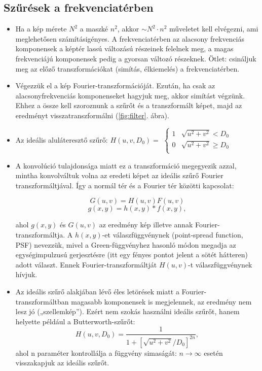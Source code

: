 \documentclass[12pt]{article}
\theoremstyle{plain}
\begin{document}
\subsection{Szűrések a frekvenciatérben}
\begin{itemize}
\item Ha a kép mérete $N^2$ a maszké $n^2$, akkor $\sim N^2 \cdot n^2$ műveletet kell elvégezni, ami meglehetősen számításigényes. A frekvenciatérben az alacsony frekvenciás komponensek a képtér lassú változású részeinek felelnek meg, a magas frekvenciájú komponensek pedig a gyorsan változó részeknek. Ötlet: csináljuk meg az előző transzformációkat (simítás, élkiemelés) a frekvenciatérben.
\item Végezzük el a kép Fourier-transzformációját. Ezután, ha csak az alacsonyfrekvenciás komponenseket hagyjuk meg, akkor simítást végzünk. Ehhez a össze kell szoroznunk a szűrőt és a transzformált képet, majd az eredményt visszatranszformálni (\ref{fig:filter}. ábra).
\item Az ideális aluláteresztő szűrő: $H(u,v,D_0) =$    $\left\{
\begin{array}{ll}
      1 & \sqrt{u^2 + v^2} < D_0 \\
      0 & \sqrt{u^2 + v^2} \geq D_0 \\
\end{array} \right.$
\item A konvolúció tulajdonsága miatt ez a transzformáció megegyezik azzal, mintha konvolváltuk volna az eredeti  képet az ideális szűrő Fourier transzformáltjával. Így a normál tér és a Fourier tér közötti kapcsolat:

$$G(u,v) = H(u,v)F(u,v)$$
$$g(x,y) = h(x,y) * f(x,y),$$

ahol $g(x,y)$ és $G(u,v)$ az eredmény kép illetve annak Fourier-transzformáltja. A $h(x,y)$-et válaszfüggvénynek (point-spread function, PSF) nevezzük, mivel a Green-függvényhez hasonló módon megadja az egységimpulzusú gerjesztésre (itt egy fényes pontot jelent a sötét hátteren) adott választ. Ennek Fourier-transzformáltját $H(u,v)$-t válaszfüggvénynek hívjuk. 

\item Az ideális szűrő alakjában lévő éles letörések miatt a Fourier-transzformáltban magasabb komponensek is megjelennek, az eredmény nem lesz jó („szellemkép”). Ezért nem szokás használni ideális szűrőt, hanem helyette például a Butterworth-szűrőt:
$$H(u,v,D_0) = \frac{1}{1+[ \sqrt{u^2 + v^2}/D_0]^{2n} },$$
ahol n paraméter kontrollálja a függvény simaságát: $n\rightarrow \infty$ esetén visszakapjuk az ideális szűrőt.  


\end{itemize}
\end{document}
